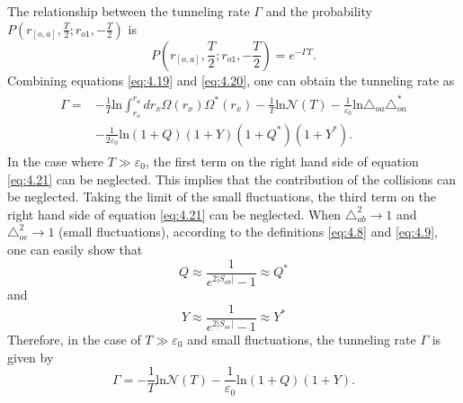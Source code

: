 \documentclass[12pt]{article}
\begin{document}
The relationship between the tunneling rate $\Gamma$ and the probability $P(r_{[o,a]},\frac{T}{2}; r_{o1}, -\frac{T}{2})$ is~\cite{SC2,RHB}
\begin{equation}
\label{eq:4.20}%
P(r_{[o,a]},\frac{T}{2}; r_{o1}, -\frac{T}{2})=e^{-\Gamma T}.
\end{equation}
Combining equations \eqref{eq:4.19} and \eqref{eq:4.20}, one can obtain the tunneling rate as
\begin{eqnarray}\begin{split}
\label{eq:4.21}%
\Gamma=&-\frac{1}{T}\mathrm{ln}\int_{r_{o}}^{r_{a}}dr_{x}\Omega(r_{x})\Omega^{*}(r_{x})-\frac{1}{T}\mathrm{ln}\mathscr{N}(T)-\frac{1}{\varepsilon_{0}}\mathrm{ln}\triangle_{oa}\triangle_{oa}^{*}
\\&-\frac{1}{2\varepsilon_{0}}\mathrm{ln}(1+Q)(1+Y)(1+Q^{*})(1+Y^{*}).
\end{split}
\end{eqnarray}
In the case where $T\gg \varepsilon_{0}$, the first term on the right hand side of equation \eqref{eq:4.21} can be neglected. This implies that the contribution of the collisions can be neglected.  Taking the limit of the small fluctuations, the third term on the right hand side of equation \eqref{eq:4.21} can be neglected. When $\triangle_{ab}^{2}\rightarrow 1$ and $\triangle_{oe}^{2}\rightarrow1$ (small fluctuations), according to the definitions \eqref{eq:4.8} and \eqref{eq:4.9}, one can easily show that
\begin{equation}
\label{eq:4.22}%
Q\approx \frac{1}{e^{2|S_{ab}|}-1}\approx Q^{*}
\end{equation}
and
\begin{equation}
\label{eq:4.23}%
Y\approx \frac{1}{e^{2|S_{oe}|}-1}\approx Y^{*}
\end{equation}
Therefore, in the case of $T\gg \varepsilon_{0}$ and small fluctuations, the tunneling rate $\Gamma$ is given by
\begin{equation}
\label{eq:4.24}%
\Gamma=-\frac{1}{T}\mathrm{ln}\mathscr{N}(T)-\frac{1}{\varepsilon_{0}}\mathrm{ln}(1+Q)(1+Y).
\end{equation}
\end{document}
